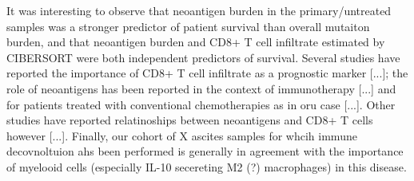 \documentclass[linenumbers]{bmcart}
\begin{document}
It was interesting to observe that neoantigen burden in the primary/untreated samples was a stronger predictor of patient survival than overall mutaiton burden, and that neoantigen burden and CD8+ T cell infiltrate estimated by CIBERSORT were both independent predictors of survival. Several studies have reported the importance of CD8+ T cell infiltrate as a prognostic marker [...]; the role of neoantigens has been reported in the context of immunotherapy [...] and for patients treated with conventional chemotherapies as in oru case [...]. Other studies have reported relatinoships between neoantigens and CD8+ T cells however  [...]. Finally, our cohort of X ascites samples for whcih immune decovnoltuion ahs been performed is generally in agreement with the importance of myelooid cells (especially IL-10 secereting M2 (?) macrophages) in this disease.





\end{document}
